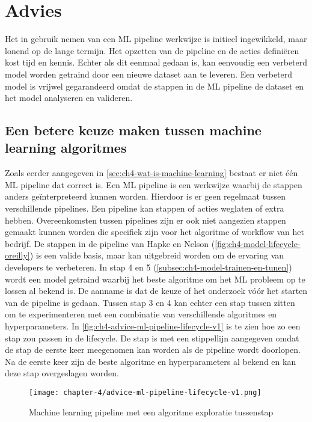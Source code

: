 \section{Advies}\label{sec:ch4-advies}
Het in gebruik nemen van een ML pipeline werkwijze is initieel ingewikkeld, maar lonend op de lange termijn. Het opzetten van de pipeline en de acties definiëren kost tijd en kennis. Echter als dit eenmaal gedaan is, kan eenvoudig een verbeterd model worden getraind door een nieuwe dataset aan te leveren. Een verbeterd model is vrijwel gegarandeerd omdat de stappen in de ML pipeline de dataset en het model analyseren en valideren.

\subsection{Een betere keuze maken tussen machine learning algoritmes}\label{subsec:ch4-een-betere-keuze-maken-tussen-machine-learning-algoritmes}
Zoals eerder aangegeven in \autoref{sec:ch4-wat-is-machine-learning} bestaat er niet één ML pipeline dat correct is. Een ML pipeline is een werkwijze waarbij de stappen anders geïnterpreteerd kunnen worden. Hierdoor is er geen regelmaat tussen verschillende pipelines. Een pipeline kan stappen of acties weglaten of extra hebben. Overeenkomsten tussen pipelines zijn er ook niet aangezien stappen gemaakt kunnen worden die specifiek zijn voor het algoritme of workflow van het bedrijf. De stappen in de pipeline van Hapke en Nelson (\autoref{fig:ch4-model-lifecycle-oreilly}) is een valide basis, maar kan uitgebreid worden om de ervaring van developers te verbeteren. In stap 4 en 5 (\autoref{subsec:ch4-model-trainen-en-tunen}) wordt een model getraind waarbij het beste algoritme om het ML probleem op te lossen al bekend is. De aanname is dat de keuze of het onderzoek vóór het starten van de pipeline is gedaan. Tussen stap 3 en 4 kan echter een stap tussen zitten om te experimenteren met een combinatie van verschillende algoritmes en hyperparameters. In \autoref{fig:ch4-advice-ml-pipeline-lifecycle-v1} is te zien hoe zo een stap zou passen in de lifecycle. De stap is met een stippellijn aangegeven omdat de stap de eerste keer meegenomen kan worden als de pipeline wordt doorlopen. Na de eerste keer zijn de beste algoritme en hyperparameters al bekend en kan deze stap overgeslagen worden.

\begin{figure}[hbt!]
  \centering
  \texttt{[image: chapter-4/advice-ml-pipeline-lifecycle-v1.png]}
  \caption{Machine learning pipeline met een algoritme exploratie tussenstap}
  \label{fig:ch4-advice-ml-pipeline-lifecycle-v1}
\end{figure}

